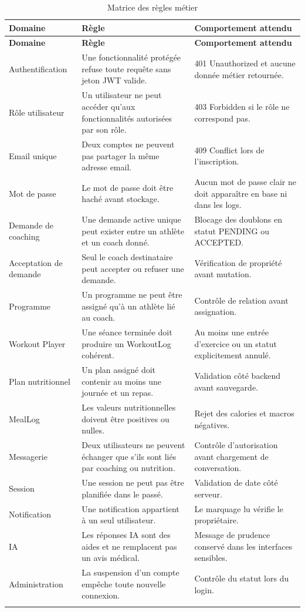 \begin{longtable}{|p{3.2cm}|p{7cm}|p{5cm}|}
\hline
\rowcolor[HTML]{FFF2CC}
\textbf{Domaine} & \textbf{Règle} & \textbf{Comportement attendu} \\ \hline
\endfirsthead
\hline
\rowcolor[HTML]{FFF2CC}
\textbf{Domaine} & \textbf{Règle} & \textbf{Comportement attendu} \\ \hline
\endhead
Authentification & Une fonctionnalité protégée refuse toute requête sans jeton JWT valide. & 401 Unauthorized et aucune donnée métier retournée. \\ \hline
Rôle utilisateur & Un utilisateur ne peut accéder qu’aux fonctionnalités autorisées par son rôle. & 403 Forbidden si le rôle ne correspond pas. \\ \hline
Email unique & Deux comptes ne peuvent pas partager la même adresse email. & 409 Conflict lors de l’inscription. \\ \hline
Mot de passe & Le mot de passe doit être haché avant stockage. & Aucun mot de passe clair ne doit apparaître en base ni dans les logs. \\ \hline
Demande de coaching & Une demande active unique peut exister entre un athlète et un coach donné. & Blocage des doublons en statut PENDING ou ACCEPTED. \\ \hline
Acceptation de demande & Seul le coach destinataire peut accepter ou refuser une demande. & Vérification de propriété avant mutation. \\ \hline
Programme & Un programme ne peut être assigné qu’à un athlète lié au coach. & Contrôle de relation avant assignation. \\ \hline
Workout Player & Une séance terminée doit produire un WorkoutLog cohérent. & Au moins une entrée d’exercice ou un statut explicitement annulé. \\ \hline
Plan nutritionnel & Un plan assigné doit contenir au moins une journée et un repas. & Validation côté backend avant sauvegarde. \\ \hline
MealLog & Les valeurs nutritionnelles doivent être positives ou nulles. & Rejet des calories et macros négatives. \\ \hline
Messagerie & Deux utilisateurs ne peuvent échanger que s’ils sont liés par coaching ou nutrition. & Contrôle d’autorisation avant chargement de conversation. \\ \hline
Session & Une session ne peut pas être planifiée dans le passé. & Validation de date côté serveur. \\ \hline
Notification & Une notification appartient à un seul utilisateur. & Le marquage lu vérifie le propriétaire. \\ \hline
IA & Les réponses IA sont des aides et ne remplacent pas un avis médical. & Message de prudence conservé dans les interfaces sensibles. \\ \hline
Administration & La suspension d’un compte empêche toute nouvelle connexion. & Contrôle du statut lors du login. \\ \hline
\caption{Matrice des règles métier}
\end{longtable}

